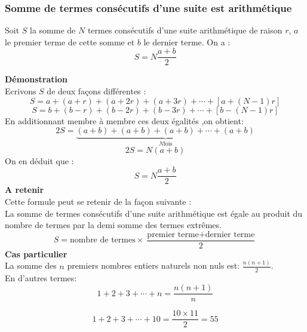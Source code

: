  \subsubsection*{Somme de termes consécutifs d'une suite est arithmétique}
   \begin{theorem} Soit $S$ la somme  de $ N $ termes consécutifs d'une  suite  arithmétique  de raison $ r $,  $ a $ le premier terme de cette somme  et $ b $ le dernier terme. On a  :     \[  S =N\dfrac{a+b}{2}\]
   \end{theorem}
 \textbf{\color{blue}Démonstration}  \\
  Ecrivons $ S $ de deux façons différentes :
  \[S= a+(a+r)+(a+2r)+ (a+3r)+ \cdots +[a+(N-1)r] \]
   \[S= b+(b-r)+(b-2r)+ (b-3r)+ \cdots +[b-(N-1)r] \]
   En additionnant membre à membre ces deux égalités ,on obtient: 
   \[2S=\underbrace{(a+b)+(a+b)+(a+b)+ \cdots +(a+b)}_{ N \text{fois}} \]
   \[2S=N(a+b)\]On en déduit que :\[S =N\dfrac{a+b}{2}\]
   \textbf{A retenir}\\ 
   Cette formule peut se retenir de la façon suivante :\\La somme de termes consécutifs d'une suite arithmétique est égale au produit du nombre de termes  par la demi somme des termes extrêmes.
   \[ S=\text{nombre  de termes}\times\dfrac{\text{premier terme}+\text{dernier terme} }{2} \]
   \textbf{Cas particulier}	\\
   La somme des $ n$ premiers nombres entiers naturels non nuls est:  $ \frac{n(n+1)}{2} $. \\En d'autres termes:
   \[1+2+3 + \cdots + n=\dfrac{n(n+1)}{n} \]
 \begin{example}
   \[1+2+3+\cdots + 10=\dfrac{10\times 11}{2}=55\]
   \end{example}
  
